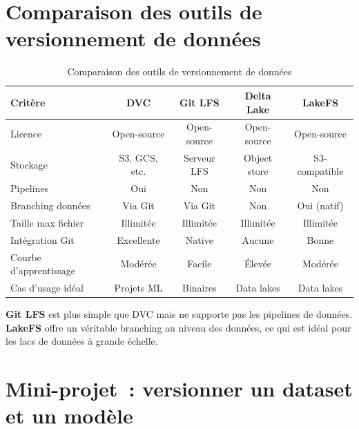 \section{Comparaison des outils de versionnement de donn\'ees}
\label{sec:version-tools-comparison}


\begin{table}[htbp]
\centering
\caption{Comparaison des outils de versionnement de donn\'ees}
\label{tab:version-tools}
\small
\begin{tabular}{lcccc}
\toprule
\textbf{Crit\`ere} & \textbf{DVC} & \textbf{Git LFS} & \textbf{Delta Lake} & \textbf{LakeFS} \\
\midrule
Licence & Open-source & Open-source & Open-source & Open-source \\
Stockage & S3, GCS, etc. & Serveur LFS & Object store & S3-compatible \\
Pipelines & Oui & Non & Non & Non \\
Branching donn\'ees & Via Git & Via Git & Non & Oui (natif) \\
Taille max fichier & Illimit\'ee & Illimit\'ee & Illimit\'ee & Illimit\'ee \\
Int\'egration Git & Excellente & Native & Aucune & Bonne \\
Courbe d'apprentissage & Mod\'er\'ee & Facile & \'Elev\'ee & Mod\'er\'ee \\
Cas d'usage id\'eal & Projets ML & Binaires & Data lakes & Data lakes \\
\bottomrule
\end{tabular}
\end{table}

\begin{remarque}
\textbf{Git LFS} est plus simple que DVC mais ne supporte pas les pipelines
de donn\'ees. \textbf{LakeFS} offre un v\'eritable branching au niveau des
donn\'ees, ce qui est id\'eal pour les lacs de donn\'ees \`a grande \'echelle.
\end{remarque}

\section{Mini-projet~: versionner un dataset et un mod\`ele}
\label{sec:miniprojet-dvc}

